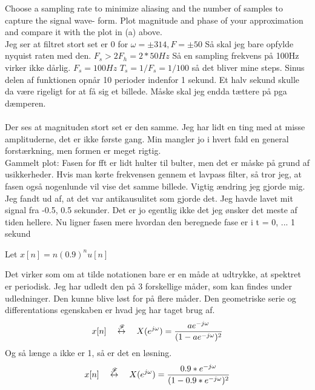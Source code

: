 \begin{Opgaver}
\begin{kapitel}
\begin{Opgave}
            \begin{UnderOpgave}
                Choose a sampling rate to minimize aliasing and the number of samples to capture the signal wave-
                form. Plot magnitude and phase of your approximation and compare it with the
                plot in (a) above.\\
                Jeg ser at filtret stort set er 0 for $\omega = \pm 314, F = \pm 50$
                Så skal jeg bare opfylde nyquist raten med den. 
                $F_s > 2F_h = 2 * 50Hz$
                Så en sampling frekvens på 100Hz virker ikke dårlig. $F_s = 100Hz$
                $T_s = 1/F_s = 1/100$ så det bliver mine steps.
                Sinus delen af funktionen opnår 10 perioder indenfor 1 sekund. Et halv sekund skulle da være rigeligt for at få sig et billede. Måske skal jeg endda tættere på pga dæmperen. 
                \\\\
                Der ses at magnituden stort set er den samme. Jeg har lidt en ting med at misse amplituderne, det er ikke første gang. 
                Min mangler jo i hvert fald en general forstærkning, men formen er meget rigtig.\\              
                \color{red}Gammelt plot: Fasen for fft er lidt hulter til bulter, men det er måske på grund af usikkerheder. 
                Hvis man kørte frekvensen gennem et lavpass filter, så tror jeg, at fasen også nogenlunde vil vise det samme billede. 
                \color{black}Vigtig ændring jeg gjorde mig. Jeg fandt ud af, at det var antikausulitet som gjorde det.
                Jeg havde lavet mit signal fra -0.5, 0.5 sekunder. Det er jo egentlig ikke det jeg ønsker det meste af tiden hellere. 
                Nu ligner fasen mere hvordan den beregnede fase er i t = 0, ... 1 sekund
            \end{UnderOpgave}
        \end{Opgave}
        \begin{Opgave}
            Let $x[n] = n(0.9)^nu[n]$
            \begin{UnderOpgave}
                Det virker som om at tilde notationen bare er en måde at udtrykke, at spektret er periodisk. 
                Jeg har udledt den på 3 forskellige måder, som kan findes under udledninger. 
                Den kunne blive løst for på flere måder. Den geometriske serie og differentations egenskaben er hvad jeg har taget brug af. 
                \[x[n] \transformation{F} X(e^{j\omega}) = \frac{ae^{-j\omega}}{(1 - ae^{-j\omega})^2}\]
                Og så længe a ikke er 1, så er det en løsning.
                \[x[n] \transformation{F} X(e^{j\omega}) = \frac{0.9*e^{-j\omega}}{(1 - 0.9*e^{-j\omega})^2}\]
            \end{UnderOpgave}


\end{Opgave}
\end{kapitel}
\end{Opgaver}
